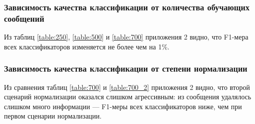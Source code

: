 \documentclass[a4paper, 14pt]{article}
\begin{document}
		\subsubsection{Зависимость качества классификации от количества обучающих сообщений}
		Из таблиц \ref{table:250}, \ref{table:500} и \ref{table:700} приложения 2 видно, что F1-мера всех классификаторов изменяется не более чем на 
		1\%. 
		
		\subsubsection{Зависимость качества классификации от степени нормализации}
		Из сравнения таблиц \ref{table:700} и \ref{table:700_2} приложения 2 видно, что второй сценарий нормализации оказался слишком агрессивным: из сообщения удалялось слишком много информации --- F1-меры всех классификаторов ниже, чем при первом сценарии нормализации. 
\end{document}

